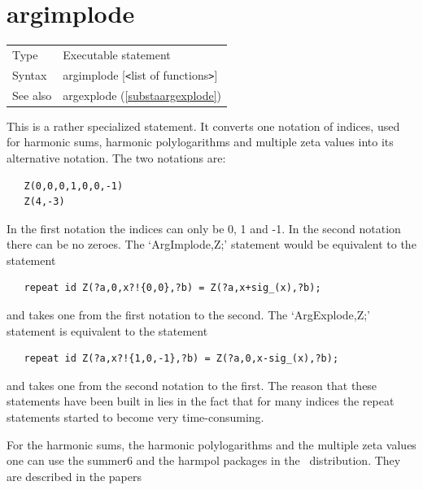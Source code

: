 
\section{argimplode}
\label{substaargimplode}

\noindent \begin{tabular}{ll}
Type & Executable statement\\
Syntax & argimplode [{\tt<}list of functions{\tt>}] \\
See also & argexplode (\ref{substaargexplode})
\end{tabular} \vspace{4mm}

\noindent This is a rather specialized statement. It converts one notation 
of indices, used for harmonic sums, harmonic 
polylogarithms and multiple zeta values into 
its alternative notation. The two notations are:
\begin{verbatim}
   Z(0,0,0,1,0,0,-1)
   Z(4,-3)
\end{verbatim}
In the first notation the indices can only be 0, 1 and -1. In the second 
notation there can be no zeroes. The `ArgImplode,Z;' 
statement would be 
equivalent to the statement
\begin{verbatim}
   repeat id Z(?a,0,x?!{0,0},?b) = Z(?a,x+sig_(x),?b);
\end{verbatim}
and takes one from the first notation to the second. The `ArgExplode,Z;' 
statement is equivalent to the statement
\begin{verbatim}
   repeat id Z(?a,x?!{1,0,-1},?b) = Z(?a,0,x-sig_(x),?b);
\end{verbatim}
and takes one from the second notation to the first. The reason that these 
statements have been built in lies in the fact that for many indices the 
repeat statements started to become very time-consuming.

\noindent For the harmonic sums, the harmonic polylogarithms and the 
multiple zeta values one can use the summer6 and the harmpol packages in 
the \FORM\ distribution. They are described in the papers

